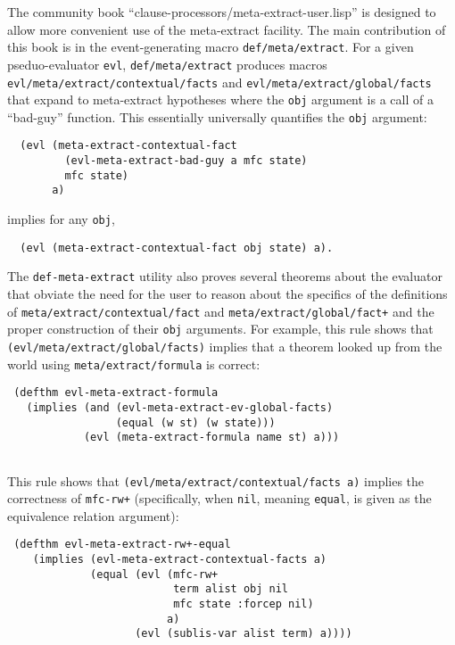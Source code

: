 The community book ``clause-processors/meta-extract-user.lisp'' is
designed to allow more convenient use of the meta-extract facility.
The main contribution of this book is in the event-generating macro
\texttt{def\-/meta\-/extract}. For a given pseduo-evaluator \texttt{evl},
\texttt{def\-/meta\-/extract} produces macros
\texttt{evl\-/meta\-/extract\-/contextual\-/facts} and
\texttt{evl\-/meta\-/extract\-/global\-/facts} that expand to meta-extract
hypotheses where the \texttt{obj} argument is a call of a ``bad-guy''
function.  This essentially universally quantifies the \texttt{obj}
argument:
\begin{verbatim}
  (evl (meta-extract-contextual-fact
         (evl-meta-extract-bad-guy a mfc state)
         mfc state)
       a)
\end{verbatim}
implies for any \texttt{obj},
\begin{verbatim}
  (evl (meta-extract-contextual-fact obj state) a).
\end{verbatim}

The \texttt{def-meta-extract} utility also proves several theorems
about the evaluator that obviate the need for the user to reason about
the specifics of the definitions of
\texttt{meta\-/extract\-/contextual\-/fact} and
\texttt{meta\-/extract\-/global\-/fact+} and the proper construction of
their \texttt{obj} arguments.  For example, this rule shows that
\texttt{(evl\-/meta\-/extract\-/global\-/facts)} implies that a theorem looked
up from the world using \texttt{meta\-/extract\-/formula} is correct:
\begin{verbatim}
 (defthm evl-meta-extract-formula
   (implies (and (evl-meta-extract-ev-global-facts)
                 (equal (w st) (w state)))
            (evl (meta-extract-formula name st) a)))
 
\end{verbatim}
This rule shows that
\texttt{(evl\-/meta\-/extract\-/contextual\-/facts a)} implies the correctness
of \texttt{mfc-rw+} (specifically, when \texttt{nil}, meaning
\texttt{equal}, is given as the equivalence relation argument):
\begin{verbatim}
 (defthm evl-meta-extract-rw+-equal
    (implies (evl-meta-extract-contextual-facts a)
             (equal (evl (mfc-rw+
                          term alist obj nil
                          mfc state :forcep nil)
                         a)
                    (evl (sublis-var alist term) a))))
\end{verbatim}


